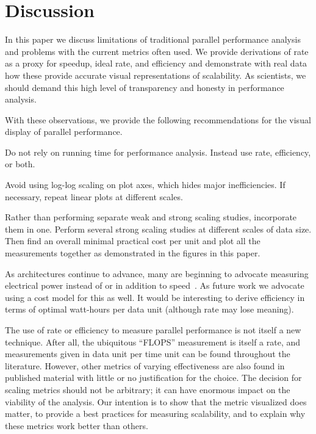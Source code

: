 \documentclass{llncs}
\newcommand*{\lcite}[1]{~\cite{#1}}
\newenvironment{packed_itemize}{
  \begin{itemize}[noitemsep]
}{
  \end{itemize}
}
\begin{document}
\section{Discussion}

\noindent
In this paper we discuss limitations of traditional parallel performance
analysis and problems with the current metrics often used. We provide
derivations of rate as a proxy for speedup, ideal rate, and efficiency and
demonstrate with real data how these provide accurate visual
representations of scalability. As scientists, we should demand this high
level of transparency and honesty in performance analysis.

With these observations, we provide the following recommendations for the
visual display of parallel performance.
\begin{packed_itemize}
\item Do not rely on running time for performance analysis. Instead use
  rate, efficiency, or both.
\item Avoid using log-log scaling on plot axes, which hides major
  inefficiencies. If necessary, repeat linear plots at different scales.
\item Rather than performing separate weak and strong scaling studies,
  incorporate them in one. Perform several strong scaling studies at
  different scales of data size. Then find an overall minimal practical
  cost per unit and plot all the measurements together as demonstrated in
  the figures in this paper.
\end{packed_itemize}

As architectures continue to advance, many are beginning to advocate
measuring electrical power instead of or in addition to
speed\lcite{Cameron2012}. As future work we advocate using a cost model for
this as well. It would be interesting to derive efficiency in terms of
optimal watt-hours per data unit (although rate may lose meaning).

The use of rate or efficiency to measure parallel performance is not itself
a new technique. After all, the ubiquitous ``FLOPS'' measurement is itself
a rate, and measurements given in data unit per time unit can be found
throughout the literature. However, other metrics of varying effectiveness
are also found in published material with little or no justification for
the choice. The decision for scaling metrics should not be arbitrary; it
can have enormous impact on the viability of the analysis. Our intention is
to show that the metric visualized does matter, to provide a best practices
for measuring scalability, and to explain why these metrics work better
than others.
\end{document}
